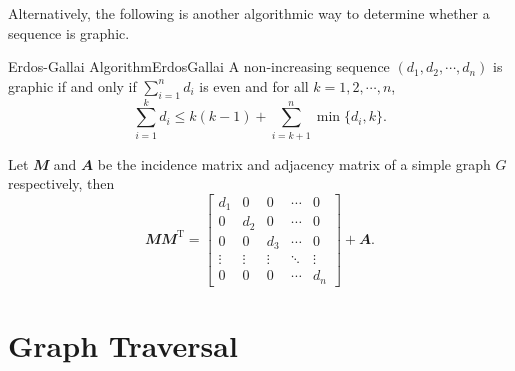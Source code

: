 \documentclass[math, code]{amznotes}
\theoremstyle{remark}
\begin{document}
Alternatively, the following is another algorithmic way to determine whether a sequence is graphic.
\begin{thmbox}{Erdos-Gallai Algorithm}{ErdosGallai}
    A non-increasing sequence $(d_1, d_2, \cdots, d_n)$ is graphic if and only if $\sum_{i = 1}^n d_i$ is even and for all $k = 1, 2, \cdots, n$,
    \begin{equation*}
        \sum_{i = 1}^{k} d_i \leq k(k - 1) + \sum_{i = k + 1}^{n}\min\{d_i, k\}.
    \end{equation*}
\end{thmbox}




\begin{probox}{}{}
    Let $\mathbfit{M}$ and $\mathbfit{A}$ be the incidence matrix and adjacency matrix of a simple graph $G$ respectively, then
    \begin{equation*}
        \mathbfit{M}\mathbfit{M}^{\mathrm{T}} = \begin{bmatrix}
            d_1 & 0 & 0 & \cdots & 0 \\
            0 & d_2 & 0 & \cdots & 0 \\
            0 & 0 & d_3 & \cdots & 0 \\
            \vdots & \vdots & \vdots & \ddots & \vdots \\
            0 & 0 & 0 & \cdots & d_n
        \end{bmatrix} + \mathbfit{A}.
    \end{equation*}
\end{probox}

\section{Graph Traversal}
\end{document}
